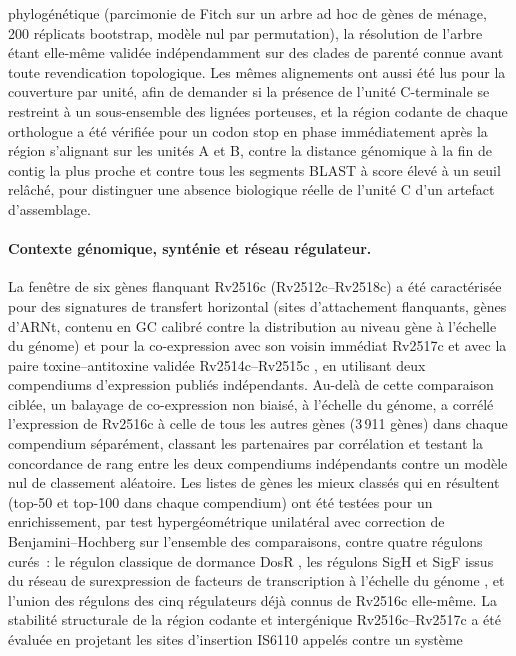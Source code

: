 \documentclass[11pt,a4paper]{article}
\begin{document}
phylogénétique (parcimonie de Fitch sur un arbre ad hoc de gènes de ménage, 200 réplicats bootstrap,
modèle nul par permutation), la résolution de l'arbre étant elle-même validée indépendamment sur des
clades de parenté connue avant toute revendication topologique. Les mêmes alignements ont aussi été
lus pour la couverture par unité, afin de demander si la présence de l'unité C-terminale se
restreint à un sous-ensemble des lignées porteuses, et la région codante de chaque orthologue a été
vérifiée pour un codon stop en phase immédiatement après la région s'alignant sur les unités A et B,
contre la distance génomique à la fin de contig la plus proche et contre tous les segments BLAST à
score élevé à un seuil relâché, pour distinguer une absence biologique réelle de l'unité C d'un
artefact d'assemblage.

\paragraph{Contexte génomique, synténie et réseau régulateur.} La fenêtre de six gènes flanquant
Rv2516c (Rv2512c--Rv2518c) a été caractérisée pour des signatures de transfert horizontal (sites
d'attachement flanquants, gènes d'ARNt, contenu en GC calibré contre la distribution au niveau
gène à l'échelle du génome) et pour la co-expression avec son voisin immédiat Rv2517c et avec la
paire toxine--antitoxine validée Rv2514c--Rv2515c \citep{tandon2019ta}, en utilisant deux
compendiums d'expression publiés indépendants. Au-delà de cette comparaison ciblée, un balayage de
co-expression non biaisé, à l'échelle du génome, a corrélé l'expression de Rv2516c à celle de tous
les autres gènes (3\,911 gènes) dans chaque compendium séparément, classant les partenaires par
corrélation et testant la concordance de rang entre les deux compendiums indépendants contre un
modèle nul de classement aléatoire. Les listes de gènes les mieux classés qui en résultent (top-50
et top-100 dans chaque compendium) ont été testées pour un enrichissement, par test hypergéométrique
unilatéral avec correction de Benjamini--Hochberg sur l'ensemble des comparaisons, contre quatre
régulons curés~: le régulon classique de dormance DosR \citep{rustad2008dosr}, les régulons SigH et
SigF issus du réseau de surexpression de facteurs de transcription à l'échelle du génome
\citep{minch2015network,rustad2014tfoe}, et l'union des régulons des cinq régulateurs déjà connus de
Rv2516c elle-même. La stabilité structurale de la région codante et intergénique
Rv2516c--Rv2517c a été évaluée en projetant les sites d'insertion IS6110 appelés contre un système
\end{document}
